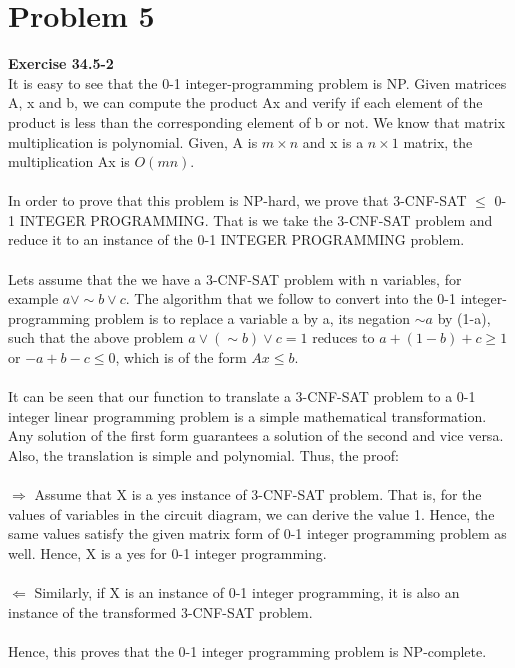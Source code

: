 \documentclass[10pt]{article}
\begin{document}
\section*{Problem 5}
\textbf{Exercise 34.5-2}\\
It is easy to see that the 0-1 integer-programming problem is NP. Given matrices A, x and b, we can compute the product Ax and verify if each element of the product is less than the corresponding element of b or not. We know that matrix multiplication is polynomial. Given, A is $m\times n$ and x is a $n\times 1$ matrix, the multiplication Ax is $O(mn)$.\\\\
In order to prove that this problem is NP-hard, we prove that 3-CNF-SAT $\leq$ 0-1 INTEGER PROGRAMMING. That is we take the 3-CNF-SAT problem and reduce it to an instance of the 0-1 INTEGER PROGRAMMING problem.\\\\
Lets assume that the we have a 3-CNF-SAT problem with n variables, for example $a \vee \sim b \vee c$. The algorithm that we follow to convert into the 0-1 integer-programming problem is to replace a variable a by a, its negation $\sim a$ by (1-a), such that the above problem $a\vee(\sim b)\vee c = 1$ reduces to $a + (1-b) + c \geq 1$ or $-a+b-c \leq 0$, which is of the form $Ax \leq b$.\\\\
It can be seen that our function to translate a 3-CNF-SAT problem to a 0-1 integer linear programming problem is a simple mathematical transformation. Any solution of the first form guarantees a solution of the second and vice versa. Also, the translation is simple and polynomial. Thus, the proof:\\\\
$\Rightarrow$ Assume that X is a yes instance of 3-CNF-SAT problem. That is, for the values of variables in the circuit diagram, we can derive the value 1. Hence, the same values satisfy the given matrix form of 0-1 integer programming problem as well. Hence, X is a yes for 0-1 integer programming.\\\\
$\Leftarrow$ Similarly, if X is an instance of 0-1 integer programming, it is also an instance of the transformed 3-CNF-SAT problem.\\\\
Hence, this proves that the 0-1 integer programming problem is NP-complete.
\newpage
\end{document}
